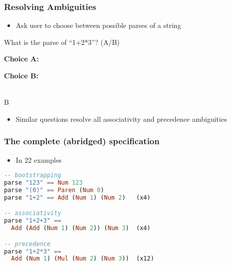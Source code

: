 \begin{frame}[fragile]
\frametitle{Resolving Ambiguities}

\begin{itemize}
\item Ask user to choose between possible parses of a string
\end{itemize}

\vspace{5mm}

\Q What is the parse of ``1+2*3''? \hspace{2mm} (A/B)

\hspace{6mm}\begin{minipage}{.4\textwidth}
{\bf Choice A:}\\
\end{minipage}
\hspace{5mm}
\begin{minipage}{.4\textwidth}
{\bf Choice B:}\\
\end{minipage}
\\
\A B
\vspace{2mm}

\begin{itemize}
\item{Similar questions resolve all associativity and precedence
    ambiguities}
\end{itemize}
\end{frame}

\begin{frame}[fragile]
\frametitle{The complete {\small(abridged)} specification}

\begin{itemize}
\item{In 22 examples}
\end{itemize}

\begin{lstlisting}[mathescape,language=haskell]
-- bootstrapping
parse "123" == Num 123
parse "(0)" == Paren (Num 0)
parse "1+2" == Add (Num 1) (Num 2)   (x4)

-- associativity
parse "1+2+3" == 
  Add (Add (Num 1) (Num 2)) (Num 3)  (x4)

-- precedence
parse "1+2*3" == 
  Add (Num 1) (Mul (Num 2) (Num 3))  (x12)
\end{lstlisting}

\end{frame}
